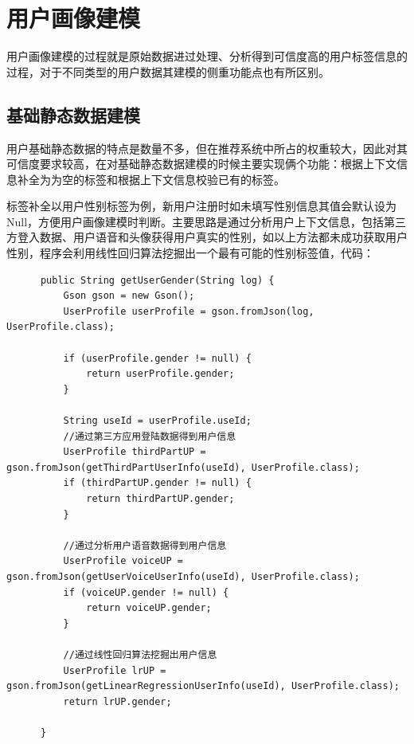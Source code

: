     \section{用户画像建模}
    用户画像建模的过程就是原始数据进过处理、分析得到可信度高的用户标签信息的过程，对于不同类型的用户数据其建模的侧重功能点也有所区别。
    \subsection{基础静态数据建模}
    用户基础静态数据的特点是数量不多，但在推荐系统中所占的权重较大，因此对其可信度要求较高，在对基础静态数据建模的时候主要实现俩个功能：根据上下文信息补全为为空的标签和根据上下文信息校验已有的标签。

    标签补全以用户性别标签为例，新用户注册时如未填写性别信息其值会默认设为Null，方便用户画像建模时判断。主要思路是通过分析用户上下文信息，包括第三方登入数据、用户语音和头像获得用户真实的性别，如以上方法都未成功获取用户性别，程序会利用线性回归算法挖掘出一个最有可能的性别标签值，代码：
    \begin{lstlisting}
      public String getUserGender(String log) {
          Gson gson = new Gson();
          UserProfile userProfile = gson.fromJson(log, UserProfile.class);

          if (userProfile.gender != null) {
              return userProfile.gender;
          }

          String useId = userProfile.useId;
          //通过第三方应用登陆数据得到用户信息
          UserProfile thirdPartUP = gson.fromJson(getThirdPartUserInfo(useId), UserProfile.class);
          if (thirdPartUP.gender != null) {
              return thirdPartUP.gender;
          }

          //通过分析用户语音数据得到用户信息
          UserProfile voiceUP = gson.fromJson(getUserVoiceUserInfo(useId), UserProfile.class);
          if (voiceUP.gender != null) {
              return voiceUP.gender;
          }

          //通过线性回归算法挖掘出用户信息
          UserProfile lrUP = gson.fromJson(getLinearRegressionUserInfo(useId), UserProfile.class);
          return lrUP.gender;

      }
    \end{lstlisting}

